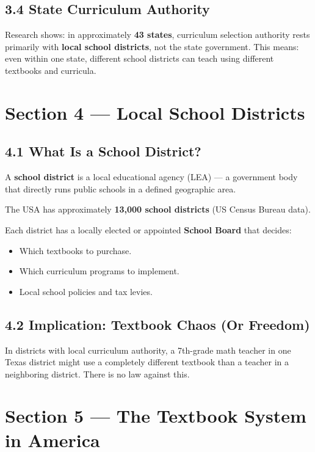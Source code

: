 	\subsection{3.4 State Curriculum Authority}

	Research shows: in approximately \textbf{43 states}, curriculum selection authority rests primarily with \textbf{local school districts}, not the state government. This means: even within one state, different school districts can teach using different textbooks and curricula.

	\section{Section 4 --- Local School Districts}

	\subsection{4.1 What Is a School District?}

	A \textbf{school district} is a local educational agency (LEA) --- a government body that directly runs public schools in a defined geographic area.

	The USA has approximately \textbf{13,000 school districts} (US Census Bureau data).

	Each district has a locally elected or appointed \textbf{School Board} that decides:
	\begin{itemize}
		\item Which textbooks to purchase.
		\item Which curriculum programs to implement.
		\item Local school policies and tax levies.
	\end{itemize}

	\subsection{4.2 Implication: Textbook Chaos (Or Freedom)}

	In districts with local curriculum authority, a 7th-grade math teacher in one Texas district might use a completely different textbook than a teacher in a neighboring district. There is no law against this.

	\section{Section 5 --- The Textbook System in America}

